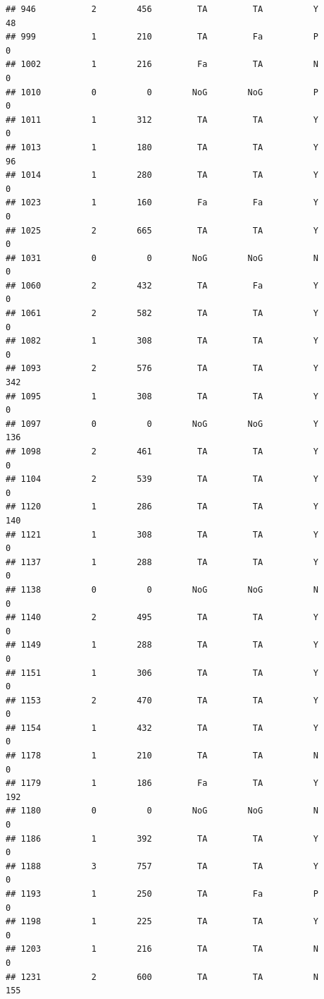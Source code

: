\documentclass[]{article}
\begin{document}
\begin{verbatim}
## 946           2        456         TA         TA          Y         48
## 999           1        210         TA         Fa          P          0
## 1002          1        216         Fa         TA          N          0
## 1010          0          0        NoG        NoG          P          0
## 1011          1        312         TA         TA          Y          0
## 1013          1        180         TA         TA          Y         96
## 1014          1        280         TA         TA          Y          0
## 1023          1        160         Fa         Fa          Y          0
## 1025          2        665         TA         TA          Y          0
## 1031          0          0        NoG        NoG          N          0
## 1060          2        432         TA         Fa          Y          0
## 1061          2        582         TA         TA          Y          0
## 1082          1        308         TA         TA          Y          0
## 1093          2        576         TA         TA          Y        342
## 1095          1        308         TA         TA          Y          0
## 1097          0          0        NoG        NoG          Y        136
## 1098          2        461         TA         TA          Y          0
## 1104          2        539         TA         TA          Y          0
## 1120          1        286         TA         TA          Y        140
## 1121          1        308         TA         TA          Y          0
## 1137          1        288         TA         TA          Y          0
## 1138          0          0        NoG        NoG          N          0
## 1140          2        495         TA         TA          Y          0
## 1149          1        288         TA         TA          Y          0
## 1151          1        306         TA         TA          Y          0
## 1153          2        470         TA         TA          Y          0
## 1154          1        432         TA         TA          Y          0
## 1178          1        210         TA         TA          N          0
## 1179          1        186         Fa         TA          Y        192
## 1180          0          0        NoG        NoG          N          0
## 1186          1        392         TA         TA          Y          0
## 1188          3        757         TA         TA          Y          0
## 1193          1        250         TA         Fa          P          0
## 1198          1        225         TA         TA          Y          0
## 1203          1        216         TA         TA          N          0
## 1231          2        600         TA         TA          N        155

\end{verbatim}
\end{document}
